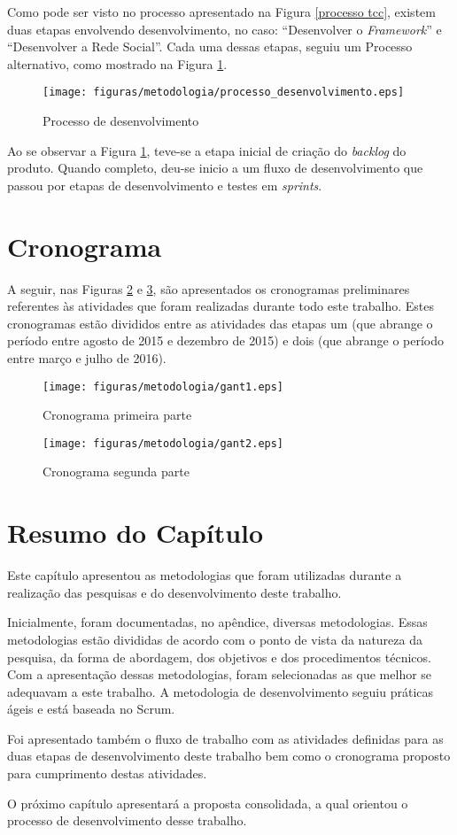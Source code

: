 Como pode ser visto no processo apresentado na Figura \ref{processo tcc}, existem duas etapas  envolvendo desenvolvimento, no caso: ``Desenvolver o \textit{Framework}'' e ``Desenvolver a Rede Social''. Cada uma dessas etapas, seguiu um Processo alternativo, como mostrado na Figura \ref{Processo desenvolvimento}.

\begin{figure}[h]
	\centering
	\texttt{[image: figuras/metodologia/processo\_desenvolvimento.eps]}
	\caption{Processo de desenvolvimento}
	\label{Processo desenvolvimento}
\end{figure}

Ao se observar a Figura \ref{Processo desenvolvimento}, teve-se a etapa inicial de criação do \textit{backlog} do produto. Quando completo, deu-se inicio a um fluxo de desenvolvimento que passou por etapas de desenvolvimento e testes em \textit{sprints}.

\section{Cronograma}

A seguir, nas Figuras \ref{cronograma_parte_1} e \ref{cronograma_parte_2}, são apresentados os cronogramas preliminares referentes às atividades que foram realizadas durante todo este trabalho. Estes cronogramas estão divididos entre as atividades das etapas um (que abrange o período entre agosto de 2015 e dezembro de 2015) e dois (que abrange o período entre março e julho de 2016).

\begin{figure}[h]
	\centering
	\texttt{[image: figuras/metodologia/gant1.eps]}
	\caption{Cronograma primeira parte}
	\label{cronograma_parte_1}
\end{figure}

\begin{figure}[h]
	\centering
	\texttt{[image: figuras/metodologia/gant2.eps]}
	\caption{Cronograma segunda parte}
	\label{cronograma_parte_2}
\end{figure}

\section{Resumo do Capítulo}

Este capítulo apresentou as metodologias que foram utilizadas durante a realização das pesquisas e do desenvolvimento deste trabalho.

Inicialmente, foram documentadas, no apêndice, diversas metodologias. Essas metodologias estão divididas de acordo com o ponto de vista da natureza da pesquisa, da forma de abordagem, dos objetivos e dos procedimentos técnicos. Com a apresentação dessas metodologias, foram selecionadas as que melhor se adequavam a este trabalho. A metodologia de desenvolvimento seguiu práticas ágeis e está baseada no Scrum.

Foi apresentado também o fluxo de trabalho com as atividades definidas para as duas etapas de desenvolvimento deste trabalho bem como o cronograma proposto para cumprimento destas atividades.

O próximo capítulo apresentará a proposta consolidada, a qual orientou o processo de desenvolvimento desse trabalho.
